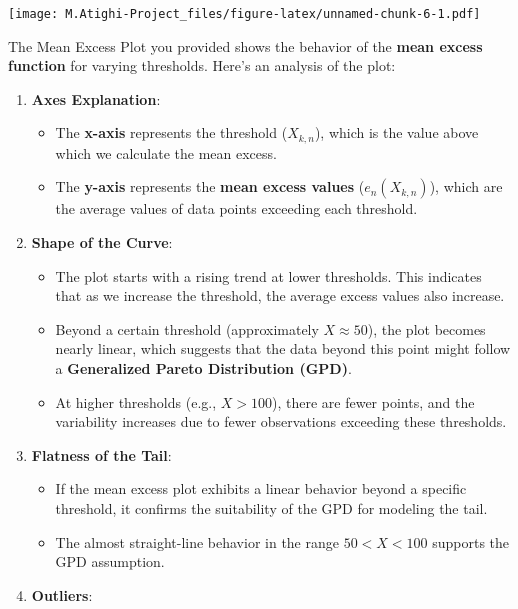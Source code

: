 \documentclass[
  12pt,
]{article}
\newenvironment{Shaded}{\begin{snugshade}}{\end{snugshade}}
\newcommand{\CommentTok}[1]{\textcolor[rgb]{0.56,0.35,0.01}{\textit{#1}}}
\providecommand{\tightlist}{%
  \setlength{\itemsep}{0pt}\setlength{\parskip}{0pt}}
\begin{document}
\texttt{[image: M.Atighi-Project\_files/figure-latex/unnamed-chunk-6-1.pdf]}

\begin{Shaded}
\end{Shaded}

The Mean Excess Plot you provided shows the behavior of the \textbf{mean
excess function} for varying thresholds. Here's an analysis of the plot:

\begin{enumerate}
\def\labelenumi{\arabic{enumi}.}
\tightlist
\item
  \textbf{Axes Explanation}:

  \begin{itemize}
  \tightlist
  \item
    The \textbf{x-axis} represents the threshold (\(X_{k,n}\)), which is
    the value above which we calculate the mean excess.
  \item
    The \textbf{y-axis} represents the \textbf{mean excess values}
    (\(e_n(X_{k,n})\)), which are the average values of data points
    exceeding each threshold.
  \end{itemize}
\item
  \textbf{Shape of the Curve}:

  \begin{itemize}
  \tightlist
  \item
    The plot starts with a rising trend at lower thresholds. This
    indicates that as we increase the threshold, the average excess
    values also increase.
  \item
    Beyond a certain threshold (approximately \(X \approx 50\)), the
    plot becomes nearly linear, which suggests that the data beyond this
    point might follow a \textbf{Generalized Pareto Distribution (GPD)}.
  \item
    At higher thresholds (e.g., \(X > 100\)), there are fewer points,
    and the variability increases due to fewer observations exceeding
    these thresholds.
  \end{itemize}
\item
  \textbf{Flatness of the Tail}:

  \begin{itemize}
  \tightlist
  \item
    If the mean excess plot exhibits a linear behavior beyond a specific
    threshold, it confirms the suitability of the GPD for modeling the
    tail.
  \item
    The almost straight-line behavior in the range \(50 < X < 100\)
    supports the GPD assumption.
  \end{itemize}
\item
  \textbf{Outliers}:


\end{enumerate}
\end{document}
